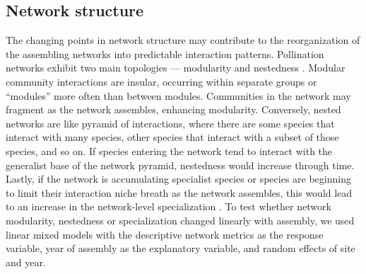 \documentclass[12pt]{article}
\begin{document}



\subsection*{Network structure}

The changing points in network structure may contribute to the
reorganization of the assembling networks into predictable interaction
patterns. Pollination networks exhibit two main topologies ---
modularity \citep[e.g.,][]{Olesen2007} and nestedness
\citep[e.g.,][]{Bascompte2006, Bascompte2003}.  Modular community
interactions are insular, occurring within separate groups or
``modules'' more often than between modules. Communities in the
network may fragment as the network assembles, enhancing
modularity. Conversely, nested networks are like pyramid of
interactions, where there are some species that interact with many
species, other species that interact with a subset of those species,
and so on. If species entering the network tend to interact with the
generalist base of the network pyramid, nestedness would increase
through time. Lastly, if the network is accumulating specialist
species or species are beginning to limit their interaction niche
breath as the network assembles, this would lead to an increase in the
network-level specialization \citep{bluthgen-2006-9}. To test whether
network modularity, nestedness or specialization changed linearly with
assembly, we used linear mixed models with the descriptive network
metrics as the response variable, year of assembly as the explanatory
variable, and random effects of site and year.
\end{document}

